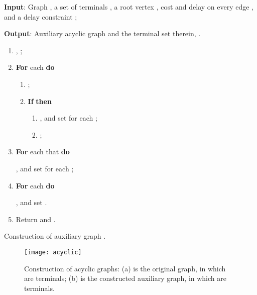 \documentclass[english,runningheads,a4paper]{llncs}
\begin{document}
\begin{algorithm}
\textbf{Input}: Graph , a set of terminals ,
a root vertex , cost and delay
 on every edge , and a delay constraint
;

\textbf{Output}: Auxiliary acyclic graph  and the terminal set
therein, .
\begin{enumerate}
\item , ;
\item \textbf{For }each  \textbf{do}

\begin{enumerate}
\item ;
\item \textbf{If}  \textbf{then}

\begin{enumerate}
\item ,
and set  for
each ;
\item ;
\end{enumerate}
\end{enumerate}
\item \textbf{For} each 
that  \textbf{do}


\quad{},
and set 
for each ;

\item \textbf{For} each  \textbf{do}


\quad{},
and set  .

\item Return  and .
\end{enumerate}
\caption{\label{alg:Construction-of-auxiliary}Construction of auxiliary graph
.}
\end{algorithm}


\begin{figure}
\begin{centering}
\texttt{[image: acyclic]}
\par\end{centering}

\caption{\label{fig:Construction-of-acyclic}Construction of acyclic graphs:
(a) is the original graph, in which  are terminals;
(b) is the constructed auxiliary graph, in which 
are terminals.}
\end{figure}
\end{document}

